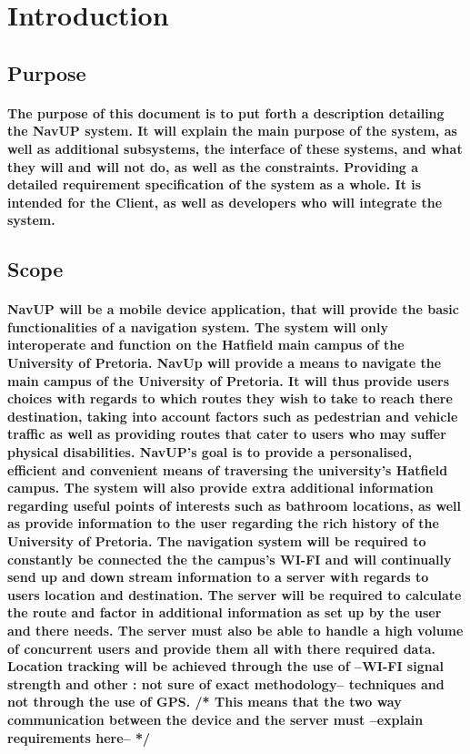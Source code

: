 \documentclass{article}
\begin{document}
	\newpage
	
	\section{Introduction}
    	
        \subsection{Purpose}
        	\paragraph{The purpose of this document is to put forth a description detailing the NavUP system. It will explain the main purpose of the system, as well as additional subsystems, the interface of these systems, and what they will and will not do, as well as the constraints. Providing a detailed requirement specification of the system as a whole. It is intended for the Client, as well as developers who will integrate the system.}
    	\subsection{Scope}
        	\paragraph{NavUP will be a mobile device application, that will provide the basic functionalities of a navigation system. The system will only interoperate and function on the Hatfield main campus of the University of Pretoria.  	NavUp will provide a means to navigate the main campus of the University of Pretoria. It will thus provide users choices with regards to which routes they wish to take to reach there destination, taking into account factors such as pedestrian and vehicle traffic as well as providing routes that cater to users who may suffer physical disabilities.  NavUP's goal is to provide a personalised, efficient and convenient means of traversing the university's Hatfield campus. The system will also provide extra additional information regarding useful points of interests such as bathroom locations, as well as provide information to the user regarding the rich history of the University of Pretoria. The navigation system will be required to constantly be connected the the campus's WI-FI and will continually send up and down stream information to a server with regards to users location and destination. The server will be required to calculate the route and factor in additional information as set up by the user and there needs. The server must also be able to handle a high volume of concurrent users and provide them all with there required data. Location tracking will be achieved through the use of --WI-FI signal strength and other : not sure of exact methodology-- techniques and not through the use of GPS. /* This means that the two way communication between the device and the server must --explain requirements here-- */ }
\end{document}
